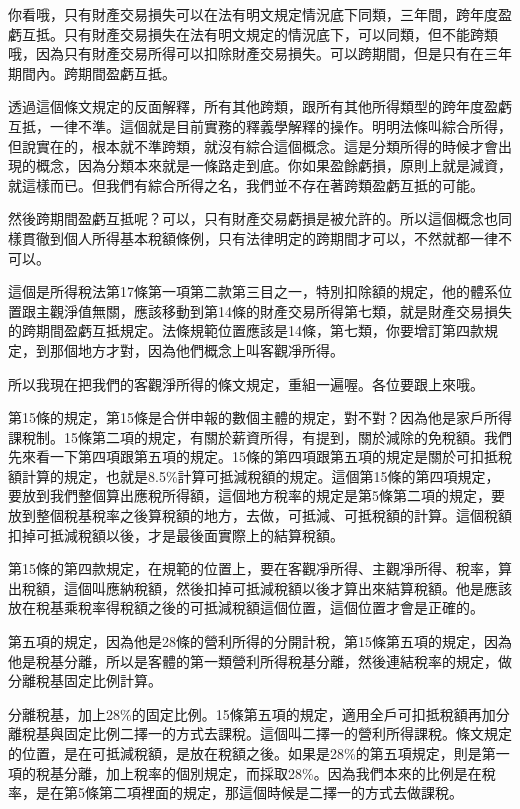 \documentclass[]{ctexbook}
\begin{document}
你看哦，只有財產交易損失可以在法有明文規定情況底下同類，三年間，跨年度盈虧互抵。只有財產交易損失在法有明文規定的情況底下，可以同類，但不能跨類哦，因為只有財產交易所得可以扣除財產交易損失。可以跨期間，但是只有在三年期間內。跨期間盈虧互抵。

透過這個條文規定的反面解釋，所有其他跨類，跟所有其他所得類型的跨年度盈虧互抵，一律不準。這個就是目前實務的釋義學解釋的操作。明明法條叫綜合所得，但說實在的，根本就不準跨類，就沒有綜合這個概念。這是分類所得的時候才會出現的概念，因為分類本來就是一條路走到底。你如果盈餘虧損，原則上就是減資，就這樣而已。但我們有綜合所得之名，我們並不存在著跨類盈虧互抵的可能。

然後跨期間盈虧互抵呢？可以，只有財產交易虧損是被允許的。所以這個概念也同樣貫徹到個人所得基本稅額條例，只有法律明定的跨期間才可以，不然就都一律不可以。

這個是所得稅法第17條第一項第二款第三目之一，特別扣除額的規定，他的體系位置跟主觀淨值無關，應該移動到第14條的財產交易所得第七類，就是財產交易損失的跨期間盈虧互抵規定。法條規範位置應該是14條，第七類，你要增訂第四款規定，到那個地方才對，因為他們概念上叫客觀凈所得。

所以我現在把我們的客觀淨所得的條文規定，重組一遍喔。各位要跟上來哦。

第15條的規定，第15條是合併申報的數個主體的規定，對不對？因為他是家戶所得課稅制。15條第二項的規定，有關於薪資所得，有提到，關於減除的免稅額。我們先來看一下第四項跟第五項的規定。15條的第四項跟第五項的規定是關於可扣抵稅額計算的規定，也就是8.5\%計算可抵減稅額的規定。這個第15條的第四項規定，要放到我們整個算出應稅所得額，這個地方稅率的規定是第5條第二項的規定，要放到整個稅基稅率之後算稅額的地方，去做，可抵減、可抵稅額的計算。這個稅額扣掉可抵減稅額以後，才是最後面實際上的結算稅額。

第15條的第四款規定，在規範的位置上，要在客觀凈所得、主觀凈所得、稅率，算出稅額，這個叫應納稅額，然後扣掉可抵減稅額以後才算出來結算稅額。他是應該放在稅基乘稅率得稅額之後的可抵減稅額這個位置，這個位置才會是正確的。

第五項的規定，因為他是28條的營利所得的分開計稅，第15條第五項的規定，因為他是稅基分離，所以是客體的第一類營利所得稅基分離，然後連結稅率的規定，做分離稅基固定比例計算。

分離稅基，加上28\%的固定比例。15條第五項的規定，適用全戶可扣抵稅額再加分離稅基與固定比例二擇一的方式去課稅。這個叫二擇一的營利所得課稅。條文規定的位置，是在可抵減稅額，是放在稅額之後。如果是28\%的第五項規定，則是第一項的稅基分離，加上稅率的個別規定，而採取28\%。因為我們本來的比例是在稅率，是在第5條第二項裡面的規定，那這個時候是二擇一的方式去做課稅。
\end{document}
